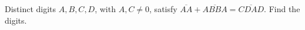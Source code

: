 Distinct digits $A,B,C,D$, with $A,C\ne0$, satisfy $\overline{AA}+\overline{ABBA}=\overline{CDAD}$. Find the digits.
